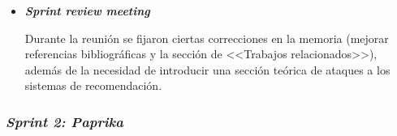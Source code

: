 \begin{itemize}
	Como se puede comprobar, no todos los objetivos marcados fueron cumplidos: la estimación del tiempo fue demasiado optimista, además de no contar con el tiempo requerido en solucionar problemas técnicos (\LaTeX{}). Se dejó para próximos sprints la lectura del último paper.

	\item \textbf{\textit{Sprint review meeting}}
	
	Durante la reunión se fijaron ciertas correcciones en la memoria (mejorar referencias bibliográficas y la sección de <<Trabajos relacionados>>), además de la necesidad de introducir una sección teórica de ataques a los sistemas de recomendación.
	
\end{itemize}


\subsubsection{\textit{Sprint 2: Paprika}}
